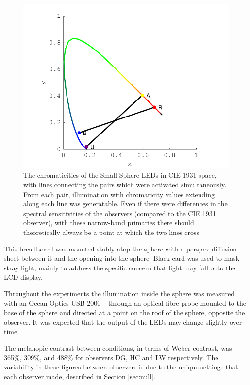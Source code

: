 \begin{figure}[htbp]
\includegraphics[max width=\textwidth,center]{figs/SmallSphere/LED_cross.pdf}
\caption{The chromaticities of the Small Sphere \glspl{LED} in CIE 1931 space, with lines connecting the pairs which were activated simultaneously. From each pair, illumination with chromaticity values extending along each line was generatable. Even if there were differences in the spectral sensitivities of the observers (compared to the CIE 1931 observer), with these narrow-band primaries there should theoretically always be a point at which the two lines cross.}
\label{fig:LED_cross}
\end{figure}

This breadboard was mounted stably atop the sphere with a perspex diffusion sheet between it and the opening into the sphere. Black card was used to mask stray light, mainly to address the specific concern that light may fall onto the LCD display.


Throughout the experiments the illumination inside the sphere was measured with an Ocean Optics USB 2000+ through an optical fibre probe mounted to the base of the sphere and directed at a point on the roof of the sphere, opposite the observer. It was expected that the output of the \glspl{LED} may change slightly over time. %

The melanopic contrast between conditions, in terms of Weber contrast, was 365\%, 309\%, and 488\% for observers DG, HC and LW respectively. The variability in these figures between observers is due to the unique settings that each observer made, described in Section \ref{sec:null}.

